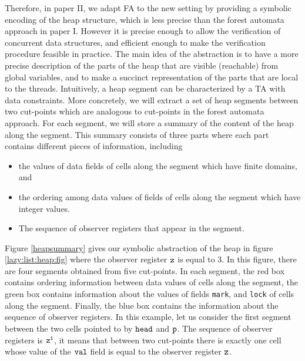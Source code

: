 Therefore, in paper II, we adapt FA to the new setting by providing a symbolic encoding of the heap structure, which is less precise than the forest automata approach in paper I. However it is precise enough to allow the verification of concurrent data structures, and efficient enough to make the verification procedure feasible in practice.
The main idea of the abstraction is to have a more precise description of the parts of the heap that are visible (reachable) from global variables, and to make a succinct representation of the parts that are local to the threads. Intuitively, a heap segment can be characterized by a TA with data constraints. More concretely, we will extract a set of heap segments between two cut-points which are analogous to cut-points in the forest automata approach. For each segment, we will store a summary of the content of the heap along the segment. This summary consists of three parts where each part contains different pieces of information, including 
\begin{itemize}
\item the values of data fields of cells along the segment which have finite domains, and
\item the ordering among data values of fields of cells along the segment which have integer values. 
\item The sequence of observer registers that appear in the segment. 
\end{itemize}
	
Figure \ref{heapsummary} gives our symbolic abstraction of the heap in figure \ref{lazy:list:heap:fig} where the observer register $\tt z$ is equal to 3. In this figure, there are four segments obtained from five cut-points. In each segment, the red box contains ordering information between data values of cells along the segment, the green box contains information about the values of fields {\tt mark}, and {\tt lock} of cells along the segment. Finally, the blue box contains the information about the sequence of observer registers. In this example, let us consider the first segment between the two cells pointed to by $\tt head$ and $\tt p$. The sequence of observer registers is $\tt z^1$, it means that between two cut-points there is exactly one cell whose value of the $\tt val$ field is equal to the observer register $\tt z$.
